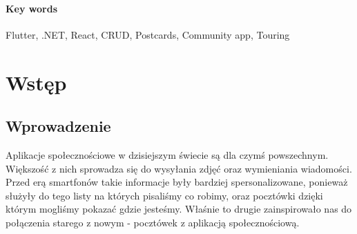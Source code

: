 \documentclass[a4paper,twoside,12pt]{book}
\newcounter{stronyPozaNumeracja}
\begin{document}
\subsubsection*{Key words}  
\begin{otherlanguage}{british}
Flutter, .NET, React, CRUD, Postcards, Community app, Touring
\end{otherlanguage}




\tableofcontents

\setcounter{stronyPozaNumeracja}{\value{page}}
\mainmatter
\pagestyle{empty}

\cleardoublepage

\pagestyle{NumeryStronNazwyRozdzialow}


\chapter{Wstęp}
\label{ch:wstep}

\section{Wprowadzenie}

Aplikacje społecznościowe w dzisiejszym świecie są dla czymś powszechnym. Większość z nich sprowadza się do wysyłania zdjęć oraz wymieniania wiadomości.  Przed erą smartfonów takie informacje były bardziej spersonalizowane, ponieważ służyły do tego listy na których pisaliśmy co robimy, oraz pocztówki dzięki którym mogliśmy pokazać gdzie jesteśmy. Właśnie to drugie zainspirowało nas do połączenia starego z nowym - pocztówek z aplikacją społecznościową.
\end{document}
